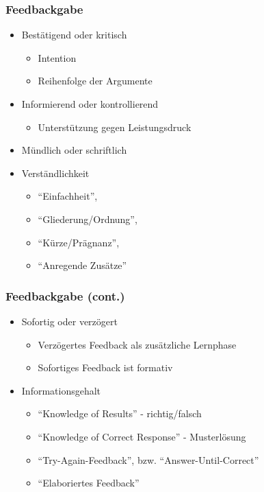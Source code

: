 \begin{frame}[<+->]
	\frametitle{Feedbackgabe}
	\begin{itemize}
		\item Bestätigend oder kritisch 
		\begin{itemize}
			\item Intention
			\item Reihenfolge der Argumente
		\end{itemize}
		\item Informierend oder kontrollierend
		\begin{itemize}
			\item Unterstützung gegen Leistungsdruck
		\end{itemize}
		\item Mündlich oder schriftlich
		\item Verständlichkeit
		\begin{itemize}
			\item ``Einfachheit'',
			\item ``Gliederung/Ordnung'',
			\item ``Kürze/Prägnanz'',
			\item ``Anregende Zusätze''
		\end{itemize}
	\end{itemize}
\end{frame}

\begin{frame}[<+->]
	\frametitle{Feedbackgabe (cont.)}
	\begin{itemize}
		\item Sofortig oder verzögert
		\begin{itemize}
			\item Verzögertes Feedback als zusätzliche Lernphase
			\item Sofortiges Feedback ist formativ
		\end{itemize}
		\item Informationsgehalt
		\begin{itemize}
			\item ``Knowledge of Results'' - richtig/falsch
			\item ``Knowledge of Correct Response'' - Musterlösung
			\item ``Try-Again-Feedback'', bzw. ``Answer-Until-Correct''
			\item ``Elaboriertes Feedback''
		\end{itemize}
	\end{itemize}
\end{frame}

